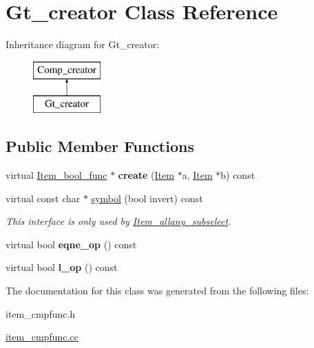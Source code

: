 \hypertarget{classGt__creator}{}\section{Gt\+\_\+creator Class Reference}
\label{classGt__creator}
Inheritance diagram for Gt\+\_\+creator\+:\begin{figure}[H]
\begin{center}
\leavevmode
\includegraphics[height=2.000000cm]{classGt__creator}
\end{center}
\end{figure}
\subsection*{Public Member Functions}
\begin{DoxyCompactItemize}
\item 
\mbox{\label{classGt__creator_a0b58627a744d536037c161cb337be053}} 
virtual \mbox{\hyperlink{classItem__bool__func}{Item\+\_\+bool\+\_\+func}} $\ast$ {\bfseries create} (\mbox{\hyperlink{classItem}{Item}} $\ast$a, \mbox{\hyperlink{classItem}{Item}} $\ast$b) const
\item 
\mbox{\label{classGt__creator_a04a64472b49b11932952d2648cdd446a}} 
virtual const char $\ast$ \mbox{\hyperlink{classGt__creator_a04a64472b49b11932952d2648cdd446a}{symbol}} (bool invert) const
\begin{DoxyCompactList}\small\item\em This interface is only used by \mbox{\hyperlink{classItem__allany__subselect}{Item\+\_\+allany\+\_\+subselect}}. \end{DoxyCompactList}\item 
\mbox{\label{classGt__creator_ac4019b11c01e10b89e217898c81e4309}} 
virtual bool {\bfseries eqne\+\_\+op} () const
\item 
\mbox{\label{classGt__creator_a1d624d02b96d324b6ff2c82a8ec92f5b}} 
virtual bool {\bfseries l\+\_\+op} () const
\end{DoxyCompactItemize}


The documentation for this class was generated from the following files\+:\begin{DoxyCompactItemize}
\item 
item\+\_\+cmpfunc.\+h\item 
\mbox{\hyperlink{item__cmpfunc_8cc}{item\+\_\+cmpfunc.\+cc}}\end{DoxyCompactItemize}
